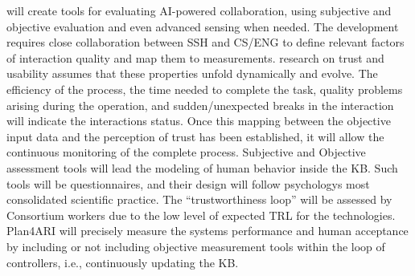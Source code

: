  will create tools for evaluating AI-powered
collaboration, using subjective and objective evaluation and even
advanced sensing when needed. The development requires close
collaboration between SSH and CS/ENG to define relevant factors of
interaction quality and map them to measurements. 
research on trust and usability assumes that these properties unfold
dynamically and evolve. The efficiency of the process, the time needed
to complete the task, quality problems arising during the operation, and
sudden/unexpected breaks in the interaction will indicate the
interaction\textquotesingle s status. Once this mapping between the
objective input data and the perception of trust has been established,
it will allow the continuous monitoring of the complete process.
Subjective and Objective assessment tools will lead the modeling of
human behavior inside the KB. Such tools will be questionnaires, and
their design will follow psychology\textquotesingle s most consolidated
scientific practice. The ``trustworthiness loop'' will be assessed by
Consortium workers due to the low level of expected TRL for the
 technologies. Plan4ARI will precisely measure the
system\textquotesingle s performance and human acceptance by including
or not including objective measurement tools within the loop of
controllers, i.e., continuously updating the KB.

